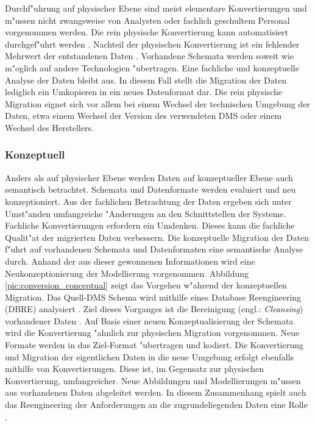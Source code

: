 Durchf"uhrung auf physischer Ebene sind meist elementare Konvertierungen und m"ussen nicht zwangsweise von Analysten oder fachlich geschultem Personal vorgenommen werden. Die rein physische Konvertierung kann automatisiert durchgef"uhrt werden \citep{abiteboul-1999}.
\lb
Nachteil der physischen Konvertierung ist ein fehlender Mehrwert der entstandenen Daten \citep{henrard-2002}. Vorhandene Schemata werden soweit wie m"oglich auf andere Technologien "ubertragen. Eine fachliche und konzeptuelle Analyse der Daten bleibt aus. In diesem Fall stellt die Migration der Daten lediglich ein Umkopieren in ein neues Datenformat dar.
\lb
Die rein physische Migration eignet sich vor allem bei einem Wechsel der technischen Umgebung der Daten, etwa einem Wechsel der Version des verwendeten DMS oder einem Wechsel des Herstellers.

\subsubsection{Konzeptuell}

Anders als auf physischer Ebene werden Daten auf konzeptueller Ebene auch semantisch betrachtet. Schemata und Datenformate werden evaluiert und neu konzeptioniert. Aus der fachlichen Betrachtung der Daten ergeben sich unter Umst"anden umfangreiche "Anderungen an den Schnittstellen der Systeme. Fachliche Konvertierungen erfordern ein Umdenken. Dieses kann die fachliche Qualit"at der migrierten Daten verbessern.
\lb
Die konzeptuelle Migration der Daten f"uhrt auf vorhandenen Schemata und Datenformaten eine semantische Analyse durch. Anhand der aus dieser gewonnenen Informationen wird eine Neukonzeptionierung der Modellierung vorgenommen. Abbildung \ref{pic:conversion_conceptual} zeigt das Vorgehen w"ahrend der konzeptuellen Migration. Das Quell-DMS Schema wird mithilfe eines Database Reengineering (DBRE) analysiert \citep{henrard-2002}. Ziel dieses Vorganges ist die Bereinigung (engl.: \textit{Cleansing}) vorhandener Daten \citep{rahm-2010} \citep{hernandez-1998}. Auf Basis einer neuen Konzeptualisierung der Schemata wird die Konvertierung "ahnlich zur physischen Migration vorgenommen. Neue Formate werden in das Ziel-Format "ubertragen und kodiert. Die Konvertierung und Migration der eigentlichen Daten in die neue Umgebung erfolgt ebenfalls mithilfe von Konvertierungen. Diese ist, im Gegensatz zur physischen Konvertierung, umfangreicher. Neue Abbildungen und Modellierungen m"ussen aus vorhandenen Daten abgeleitet werden. In diesem Zusammenhang spielt auch das Reengineering der Anforderungen an die zugrundeliegenden Daten eine Rolle \citep{aiken-1994}.

